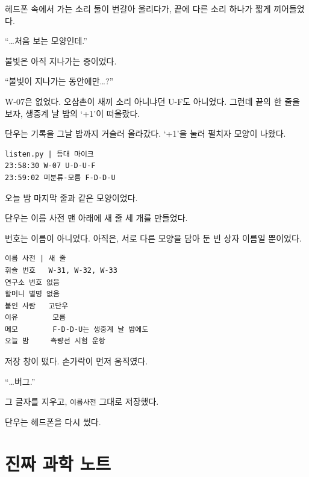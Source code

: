 \documentclass[
  korean,
  letterpaper,
  twoside,
  open=any,
  fontsize=12.5pt,
  headings=small]{scrbook}
\newcommand{\logfont}{\linespread{1}\fontsize{10.8}{15.2}\selectfont}
\newcommand{\dateline}[1]{\par\noindent{\sffamily\small\color{gray}#1}\par\medskip}
\newcommand{\backmatterstyle}{\setlength{\parindent}{0pt}\setlength{\parskip}{0.45em plus 0.1em}\backmattersize}
\newcommand{\backmattersize}{\fontsize{10.5pt}{16.5pt}\selectfont}
\newcommand{\tocgroup}[1]{%
  \addvspace{6mm}%
  \noindent\textcolor{tocsea}{\rule{1.2mm}{4.2mm}}\hspace{2.5mm}%
  {\sffamily\bfseries\fontsize{12}{16}\selectfont\color{tocsea}#1}\par
  \addvspace{1.5mm}}
\begin{document}
헤드폰 속에서 가는 소리 둘이
번갈아 울리다가, 끝에 다른
소리 하나가 짧게 끼어들었다.

``\ldots 처음 보는 모양인데.''

불빛은 아직 지나가는 중이었다.

``불빛이 지나가는
동안에만\ldots?''

W-07은 없었다. 오삼촌이 새끼
소리 아니냐던 \mbox{U-F도}
아니었다. 그런데 끝의 한 줄을
보자, 생중계 날 밤의 `+1'이
떠올랐다.

단우는 기록을 그날 밤까지
거슬러 올라갔다. `+1'을 눌러
펼치자 모양이 나왔다.

\begin{Verbatim}[samepage=true,frame=single,framesep=2.5mm,rulecolor=\color{gray},formatcom=\logfont]
listen.py | 등대 마이크
23:58:30 W-07 U-D-U-F
23:59:02 미분류-모름 F-D-D-U
\end{Verbatim}

오늘 밤 마지막 줄과 같은
모양이었다.

단우는 이름 사전 맨 아래에 새
줄 세 개를 만들었다.

번호는 이름이 아니었다.
아직은, 서로 다른 모양을 담아
둔 빈 상자 이름일 뿐이었다.

\begin{Verbatim}[samepage=true,frame=single,framesep=2.5mm,rulecolor=\color{gray},formatcom=\logfont]
이름 사전 | 새 줄
휘슬 번호   W-31, W-32, W-33
연구소 번호 없음
할머니 별명 없음
붙인 사람   고단우
이유        모름
메모        F-D-D-U는 생중계 날 밤에도
오늘 밤     측량선 시험 운항
\end{Verbatim}

저장 창이 떴다. 손가락이 먼저
움직였다.

\dateline{이름사전\_최종\_진짜최종}

``\ldots 버그.''

그 글자를 지우고,
\texttt{이름사전} 그대로
저장했다.

단우는 헤드폰을 다시 썼다.

\addtocontents{toc}{\protect\tocgroup{책 뒤에}}


\chapter*{진짜 과학
노트}\label{uxc9c4uxc9dc-uxacfcuxd559-uxb178uxd2b8}


\backmatterstyle
\end{document}
